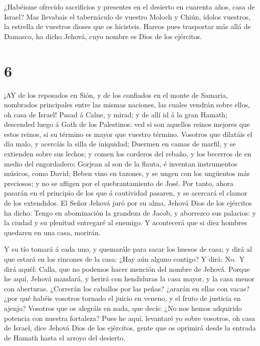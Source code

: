  ¿Habéisme ofrecido sacrificios y presentes en el desierto
en cuarenta años, casa de Israel?  Mas llevabais el
tabernáculo de vuestro Moloch y Chiún, ídolos vuestros, la estrella de
vuestros dioses que os hicisteis.  Hareos pues trasportar
más allá de Damasco, ha dicho Jehová, cuyo nombre es Dios de los
ejércitos.

\hypertarget{section-5}{%
\section{6}\label{section-5}}

 ¡AY de los reposados en Sión, y de los confiados en el
monte de Samaria, nombrados principales entre las mismas naciones, las
cuales vendrán sobre ellos, oh casa de Israel!  Pasad á
Calne, y mirad; y de allí id á la gran Hamath; descended luego á Gath de
los Palestinos: ved si son aquellos reinos mejores que estos reinos, si
su término es mayor que vuestro término.  Vosotros que
dilatáis el día malo, y acercáis la silla de iniquidad; 
Duermen en camas de marfil, y se extienden sobre sus lechos; y comen los
corderos del rebaño, y los becerros de en medio del engordadero;
 Gorjean al son de la flauta, é inventan instrumentos
músicos, como David;  Beben vino en tazones, y se ungen con
los ungüentos más preciosos; y no se afligen por el quebrantamiento de
José.  Por tanto, ahora pasarán en el principio de los que á
cautividad pasaren, y se acercará el clamor de los extendidos.
 El Señor Jehová juró por su alma, Jehová Dios de los
ejércitos ha dicho: Tengo en abominación la grandeza de Jacob, y
aborrezco sus palacios: y la ciudad y su plenitud entregaré al enemigo.
 Y acontecerá que si diez hombres quedaren en una casa,
morirán.

 Y su tío tomará á cada uno, y quemarále para sacar los
huesos de casa; y dirá al que estará en los rincones de la casa: ¿Hay
aún alguno contigo? Y dirá: No.~Y dirá aquél: Calla, que no podemos
hacer mención del nombre de Jehová.  Porque he aquí, Jehová
mandará, y herirá con hendiduras la casa mayor, y la casa menor con
aberturas.  ¿Correrán los caballos por las peñas? ¿ararán
en ellas con vacas? ¿por qué habéis vosotros tornado el juicio en
veneno, y el fruto de justicia en ajenjo?  Vosotros que os
alegráis en nada, que decís: ¿No nos hemos adquirido potencia con
nuestra fortaleza?  Pues he aquí, levantaré yo sobre
vosotros, oh casa de Israel, dice Jehová Dios de los ejércitos, gente
que os oprimirá desde la entrada de Hamath hasta el arroyo del desierto.

